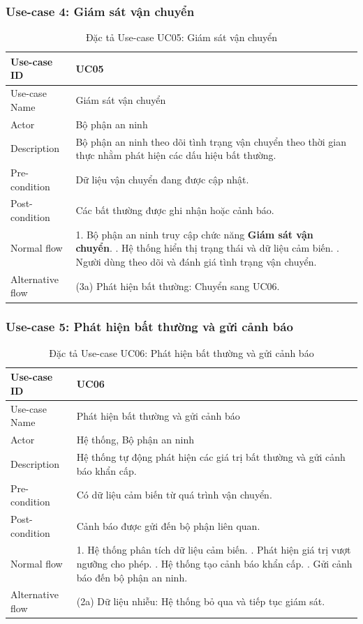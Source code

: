 \subsubsection{Use-case 4: Giám sát vận chuyển}
\begin{table}[H]
\centering
\begin{tabularx}{\textwidth}{|l|X|}
\hline
Use-case ID & UC05 \\ \hline
Use-case Name & Giám sát vận chuyển \\ \hline
Actor & Bộ phận an ninh \\ \hline
Description & Bộ phận an ninh theo dõi tình trạng vận chuyển theo thời gian thực nhằm phát hiện các dấu hiệu bất thường. \\ \hline
Pre-condition & Dữ liệu vận chuyển đang được cập nhật. \\ \hline
Post-condition & Các bất thường được ghi nhận hoặc cảnh báo. \\ \hline
Normal flow &
1. Bộ phận an ninh truy cập chức năng \textbf{Giám sát vận chuyển}. \newline
2. Hệ thống hiển thị trạng thái và dữ liệu cảm biến. \newline
3. Người dùng theo dõi và đánh giá tình trạng vận chuyển. \\ \hline
Alternative flow &
(3a) Phát hiện bất thường: Chuyển sang UC06. \\ \hline
\end{tabularx}
\caption{Đặc tả Use-case UC05: Giám sát vận chuyển}
\end{table}

\subsubsection{Use-case 5: Phát hiện bất thường và gửi cảnh báo}
\begin{table}[H]
\centering
\begin{tabularx}{\textwidth}{|l|X|}
\hline
Use-case ID & UC06 \\ \hline
Use-case Name & Phát hiện bất thường và gửi cảnh báo \\ \hline
Actor & Hệ thống, Bộ phận an ninh \\ \hline
Description & Hệ thống tự động phát hiện các giá trị bất thường và gửi cảnh báo khẩn cấp. \\ \hline
Pre-condition & Có dữ liệu cảm biến từ quá trình vận chuyển. \\ \hline
Post-condition & Cảnh báo được gửi đến bộ phận liên quan. \\ \hline
Normal flow &
1. Hệ thống phân tích dữ liệu cảm biến. \newline
2. Phát hiện giá trị vượt ngưỡng cho phép. \newline
3. Hệ thống tạo cảnh báo khẩn cấp. \newline
4. Gửi cảnh báo đến bộ phận an ninh. \\ \hline
Alternative flow &
(2a) Dữ liệu nhiễu: Hệ thống bỏ qua và tiếp tục giám sát. \\ \hline
\end{tabularx}
\caption{Đặc tả Use-case UC06: Phát hiện bất thường và gửi cảnh báo}
\end{table}



